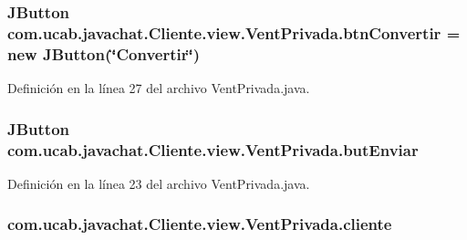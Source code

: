 \hypertarget{classcom_1_1ucab_1_1javachat_1_1_cliente_1_1view_1_1_vent_privada_a23208b69a72c135e6d1cb0b18dcf7b80}{
\subsubsection[{btn\-Convertir}]{\setlength{\rightskip}{0pt plus 5cm}J\-Button com.\-ucab.\-javachat.\-Cliente.\-view.\-Vent\-Privada.\-btn\-Convertir = new J\-Button(\char`\"{}Convertir\char`\"{})}}\label{classcom_1_1ucab_1_1javachat_1_1_cliente_1_1view_1_1_vent_privada_a23208b69a72c135e6d1cb0b18dcf7b80}


Definición en la línea 27 del archivo Vent\-Privada.\-java.

\hypertarget{classcom_1_1ucab_1_1javachat_1_1_cliente_1_1view_1_1_vent_privada_af816b1ead45d840539150f38f6817c05}{
\subsubsection[{but\-Enviar}]{\setlength{\rightskip}{0pt plus 5cm}J\-Button com.\-ucab.\-javachat.\-Cliente.\-view.\-Vent\-Privada.\-but\-Enviar}}\label{classcom_1_1ucab_1_1javachat_1_1_cliente_1_1view_1_1_vent_privada_af816b1ead45d840539150f38f6817c05}


Definición en la línea 23 del archivo Vent\-Privada.\-java.

\hypertarget{classcom_1_1ucab_1_1javachat_1_1_cliente_1_1view_1_1_vent_privada_aa8819d3a727764f7d06a273e8a4719dd}{
\subsubsection[{cliente}]{ com.\-ucab.\-javachat.\-Cliente.\-view.\-Vent\-Privada.\-cliente}}\label{classcom_1_1ucab_1_1javachat_1_1_cliente_1_1view_1_1_vent_privada_aa8819d3a727764f7d06a273e8a4719dd}


